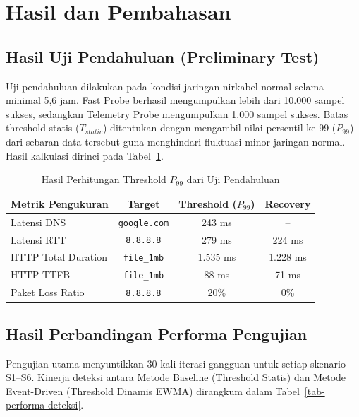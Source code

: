\section{Hasil dan Pembahasan}
\label{sec-hasil-dan-pembahasan}

\subsection{Hasil Uji Pendahuluan (Preliminary Test)}
Uji pendahuluan dilakukan pada kondisi jaringan nirkabel normal selama minimal 5,6 jam. Fast Probe berhasil mengumpulkan lebih dari 10.000 sampel sukses, sedangkan Telemetry Probe mengumpulkan 1.000 sampel sukses. Batas threshold statis ($T_{static}$) ditentukan dengan mengambil nilai persentil ke-99 ($P_{99}$) dari sebaran data tersebut guna menghindari fluktuasi minor jaringan normal. Hasil kalkulasi dirinci pada Tabel~\ref{tab-threshold-p99}.

\begin{table}[h]
\caption{Hasil Perhitungan Threshold $P_{99}$ dari Uji Pendahuluan}
\label{tab-threshold-p99}
\centering
\begin{tabular}{lccc}
\toprule
\textbf{Metrik Pengukuran} & \textbf{Target} & \textbf{Threshold ($P_{99}$)} & \textbf{Recovery} \\
\midrule
Latensi DNS & \texttt{google.com} & 243 ms & -- \\
Latensi RTT & \texttt{8.8.8.8} & 279 ms & 224 ms \\
HTTP Total Duration & \texttt{file\_1mb} & 1.535 ms & 1.228 ms \\
HTTP TTFB & \texttt{file\_1mb} & 88 ms & 71 ms \\
Paket Loss Ratio & \texttt{8.8.8.8} & 20\% & 0\% \\
\bottomrule
\end{tabular}
\end{table}

\subsection{Hasil Perbandingan Performa Pengujian}
Pengujian utama menyuntikkan 30 kali iterasi gangguan untuk setiap skenario S1--S6. Kinerja deteksi antara Metode Baseline (Threshold Statis) dan Metode Event-Driven (Threshold Dinamis EWMA) dirangkum dalam Tabel~\ref{tab-performa-deteksi}.

